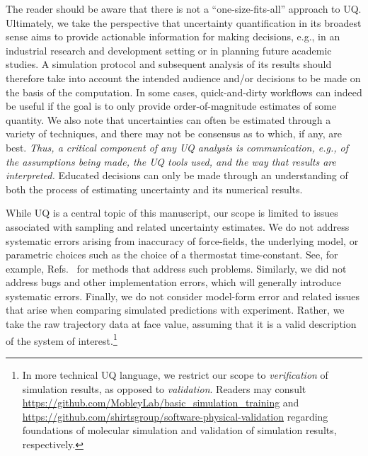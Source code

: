 The reader should be aware that there is not a ``one-size-fits-all'' approach to UQ.  Ultimately, we take the perspective that uncertainty quantification in its broadest sense aims to provide actionable information for making decisions, e.g., in an industrial research and development setting or in planning future academic studies.  A simulation protocol and subsequent analysis of its results should therefore take into account the intended audience and/or decisions to be made on the basis of the computation.  In some cases, quick-and-dirty workflows can indeed be useful if the goal is to only provide order-of-magnitude estimates of some quantity.  We also note that uncertainties can often be estimated through a variety of techniques, and there may not be consensus as to which, if any, are best.  {\it Thus, a critical component of any UQ analysis is communication, e.g., of the assumptions being made, the UQ tools used, and the way that results are interpreted.}  Educated decisions can only be made through an understanding of both the process of estimating uncertainty and its numerical results.

While UQ is a central topic of this manuscript, our scope is limited to issues associated with sampling and related uncertainty estimates.  We do not address systematic errors arising from inaccuracy of force-fields, the underlying model, or parametric choices such as the choice of a thermostat time-constant.  See, for example, Refs.~\cite{Leimkuhler,Rizzi2,Rizzi3,Rizzi4} for methods that address such problems.  Similarly, we did not address bugs and other implementation errors, which will generally introduce systematic errors. Finally, we do not consider model-form error and related issues that arise when comparing simulated predictions with experiment.  Rather, we take the raw trajectory data at face value, assuming that it is a valid description of the system of interest.\footnote{In more technical UQ language, we restrict our scope to {\it verification} of simulation results, as opposed to {\it validation}. Readers may consult \url{https://github.com/MobleyLab/basic_simulation_training} and \url{https://github.com/shirtsgroup/software-physical-validation} regarding foundations of molecular simulation and validation of simulation results, respectively.}
